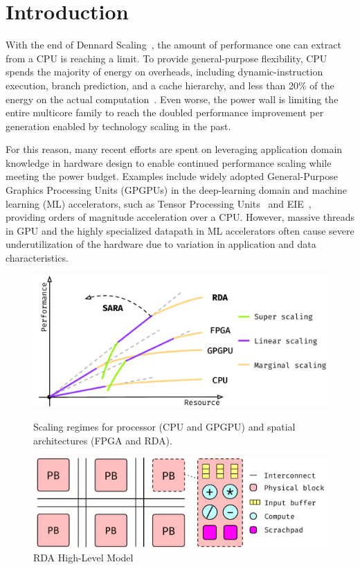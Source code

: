 \section{Introduction}
\label{sec:introduction}

With the end of Dennard Scaling~\cite{dennard}, the amount of performance one can extract from a CPU is reaching a limit.
To provide general-purpose flexibility, CPU spends the majority of energy on overheads, including dynamic-instruction execution, branch prediction, and a cache hierarchy, and less than 20\% of the energy on the actual computation~\cite{mark}.
Even worse, the power wall is limiting the entire multicore family
to reach the doubled performance improvement per generation enabled by technology scaling in the past\cite{multicorescale}.

For this reason, many recent efforts are spent on leveraging application domain knowledge in hardware design to enable 
continued performance scaling while meeting the power budget\cite{turinglecture}.
Examples include widely adopted General-Purpose Graphics Processing Units (GPGPUs) in the deep-learning domain and machine learning (ML) accelerators, such as Tensor Processing Units~\cite{tpu} and EIE~\cite{eie}, providing orders of magnitude acceleration over a CPU.
However, massive threads in GPU and the highly specialized datapath in ML accelerators often cause severe
underutilization of the hardware due to variation in application and data characteristics\cite{tz_rnn}.

\begin{figure}[!tbp]
  \centering
  \includegraphics[height=0.1\paperheight]{figures/parpipe.pdf}
  \caption{Scaling regimes for processor (CPU and GPGPU) and spatial architectures (FPGA and RDA).}
  \label{fig:scaling}
  \includegraphics[width=1\columnwidth, height=0.1\paperheight, keepaspectratio]{figures/rda_arch.pdf}
  \caption{RDA High-Level Model}\label{fig:arch}
\end{figure}

